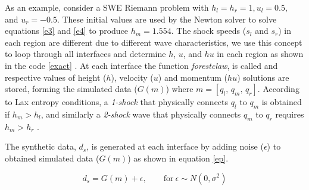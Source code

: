 \documentclass[12pt,a4paper]{article}
\begin{document}
 As an example, consider a SWE Riemann problem with $h_l = h_r = 1, u_l = 0.5, $ and $u_r = -0.5$. These initial values are used by the Newton solver to solve equations \eqref{e3} and \eqref{e4} to produce $h_{m} = 1.554$. The shock speeds ($s_l$ and $s_r$) in each region are different due to different wave characteristics, we use this concept to loop through all interfaces and determine $h$, $u$, and $hu$ in each region as shown in the code \ref{exact} . At each interface the function {\em forestclaw}, is called and respective values of   height ($h$), velocity ($u$) and momentum  ($hu$) solutions are stored, forming the simulated data  ($G(m)$) where $m=  [ q_l, \, q_m, \, q_r]$. According to Lax entropy conditions, a  {\em 1-shock} that physically connects $q_l$ to $q_m$ is obtained if $h_m>h_l$, and similarly a {\em 2-shock} wave that physically connects $q_m$ to $q_r$ requires $h_m>h_r$  \citep{le-ge-be:2011}.
	
	The synthetic data, $d_s$, is generated at each interface by adding noise ($\epsilon$) to obtained simulated data  ($G(m)$)  as shown in equation \eqref{ep}.
	
	\begin{equation}
		d_s = G(m) + \epsilon,  \qquad \text{for} ~ \epsilon \sim N(0,\sigma^{2})
		\label{ep}
	\end{equation}
	
\end{document}
